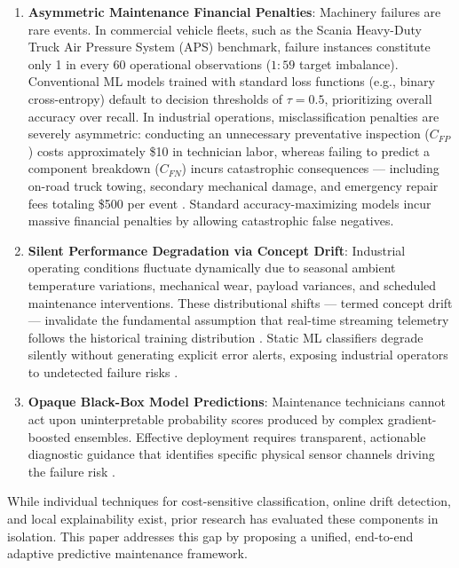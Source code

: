 \documentclass[conference]{IEEEtran}
\begin{document}
\begin{enumerate}
    \item \textbf{Asymmetric Maintenance Financial Penalties}: Machinery failures are rare events. In commercial vehicle fleets, such as the Scania Heavy-Duty Truck Air Pressure System (APS) benchmark, failure instances constitute only 1 in every 60 operational observations ($1:59$ target imbalance). Conventional ML models trained with standard loss functions (e.g., binary cross-entropy) default to decision thresholds of $\tau = 0.5$, prioritizing overall accuracy over recall. In industrial operations, misclassification penalties are severely asymmetric: conducting an unnecessary preventative inspection ($C_{FP}$) costs approximately \$10 in technician labor, whereas failing to predict a component breakdown ($C_{FN}$) incurs catastrophic consequences --- including on-road truck towing, secondary mechanical damage, and emergency repair fees totaling \$500 per event \cite{akarte2018}. Standard accuracy-maximizing models incur massive financial penalties by allowing catastrophic false negatives.
    \item \textbf{Silent Performance Degradation via Concept Drift}: Industrial operating conditions fluctuate dynamically due to seasonal ambient temperature variations, mechanical wear, payload variances, and scheduled maintenance interventions. These distributional shifts --- termed concept drift --- invalidate the fundamental assumption that real-time streaming telemetry follows the historical training distribution \cite{lu2019}. Static ML classifiers degrade silently without generating explicit error alerts, exposing industrial operators to undetected failure risks \cite{tzelepis2025}.
    \item \textbf{Opaque Black-Box Model Predictions}: Maintenance technicians cannot act upon uninterpretable probability scores produced by complex gradient-boosted ensembles. Effective deployment requires transparent, actionable diagnostic guidance that identifies specific physical sensor channels driving the failure risk \cite{mothilal2020}.
\end{enumerate}

While individual techniques for cost-sensitive classification, online drift detection, and local explainability exist, prior research has evaluated these components in isolation. This paper addresses this gap by proposing a unified, end-to-end adaptive predictive maintenance framework.
\end{document}
